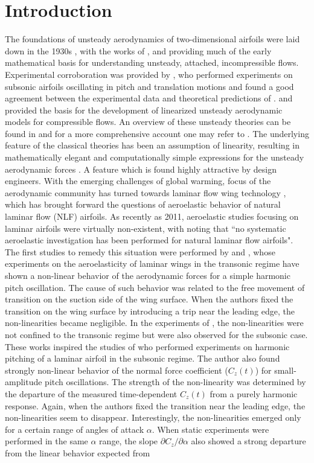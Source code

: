 \section{Introduction}
The foundations of unsteady aerodynamics of two-dimensional airfoils were laid down in the 1930s \citep{leishman00}, with the works of \cite{glauert30}, \cite{theodorsen35} and \cite{karman38} providing much of the early mathematical basis for understanding unsteady, attached, incompressible flows. Experimental corroboration was provided by \cite{halfman52}, who performed experiments on subsonic airfoils oscillating in pitch and translation motions and found a good agreement between the experimental data and theoretical predictions of \cite{theodorsen35}. \cite{lomax52} and \cite{lomax53} provided the basis for the development of linearized unsteady aerodynamic models for compressible flows. An overview of these unsteady theories can be found in \cite{leishman00} and for a more comprehensive account one may refer to \cite{bisplingoff00}. The underlying feature of the classical theories has been an assumption of linearity, resulting in mathematically elegant and computationally simple expressions for the unsteady aerodynamic forces \citep{leishman00}. A feature which is found highly attractive by design engineers. With the emerging challenges of global warming, focus of the aerodynamic community has turned towards laminar flow wing technology \citep{green08}, which has brought forward the questions of aeroelastic behavior of natural laminar flow (NLF) airfoils. As recently as 2011, aeroelastic studies focusing on laminar airfoils were virtually non-existent, with \cite{mai11} noting that ``no systematic aeroelastic investigation has been performed for natural laminar flow airfoils". The first studies to remedy this situation were performed by \cite{mai11} and \cite{hebler13}, whose experiments on the aeroelasticity of laminar wings in the transonic regime have shown a non-linear behavior of the aerodynamic forces for a simple harmonic pitch oscillation. The cause of such behavior was related to the free movement of transition on the suction side of the wing surface. When the authors fixed the transition on the wing surface by introducing a trip near the leading edge, the non-linearities became negligible. In the experiments of \cite{mai11}, the non-linearities were not confined to the transonic regime but were also observed for the subsonic case. These works inspired the studies of \cite{lokattthesis} who performed experiments on harmonic pitching of a laminar airfoil in the subsonic regime. The author also found strongly non-linear behavior of the normal force coefficient ($C_{z}(t)$) for small-amplitude pitch oscillations. The strength of the non-linearity was determined by the departure of the measured time-dependent $C_{z}(t)$ from a purely harmonic response. Again, when the authors fixed the transition near the leading edge, the non-linearities seem to disappear. Interestingly, the non-linearities emerged only for a certain range of angles of attack $\alpha$. When static experiments were performed in the same $\alpha$ range, the slope $\partial C_{z}/\partial\alpha$ also showed a strong departure from the linear behavior expected from 